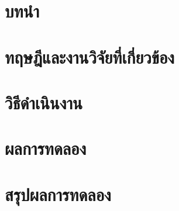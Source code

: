 \documentclass{cpereport}
\begin{document}
\tableofcontents
\listoffigures
\listoftables


\chapter{บทนำ}



\chapter{ทฤษฎีและงานวิจัยที่เกี่ยวข้อง}



\chapter{วิธีดำเนินงาน}



\chapter{ผลการทดลอง}



\chapter{สรุปผลการทดลอง}



 

\end{document}
